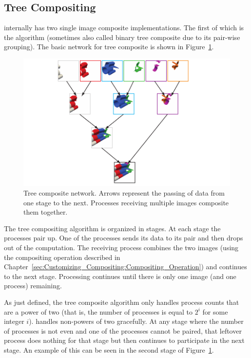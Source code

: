 \subsection{Tree Compositing}


\IceT internally has two single image composite implementations.  The first
of which is the  algorithm (sometimes also called
binary tree composite due to its pair-wise grouping).  The basic network
for tree composite is shown in Figure~\ref{fig:BinaryTree}.

\begin{figure}
  \centering
  \includegraphics{images/BinaryTree}
  \caption[Tree composite network.]{Tree composite network.  Arrows
    represent the passing of data from one stage to the next.  Processes
    receiving multiple images composite them together.}
  \label{fig:BinaryTree}
\end{figure}

The tree compositing algorithm is organized in stages.  At each stage the
processes pair up.  One of the processes sends its data to its pair and
then drops out of the computation.  The receiving process combines the two
images (using the compositing operation
described in
Chapter~\ref{sec:Customizing_Compositing:Compositing_Operation}) and
continues to the next stage.  Processing continues until there is only one
image (and one process) remaining.

As just defined, the tree composite algorithm only handles process counts
that are a power of two (that is, the number of processes is equal to $2^i$
for some integer $i$).  \IceT handles non-powers of two gracefully.  At any
stage where the number of processes is not even and one of the processes
cannot be paired, that leftover process does nothing for that stage but
then continues to participate in the next stage.  An example of this can be
seen in the second stage of Figure~\ref{fig:BinaryTree}.

